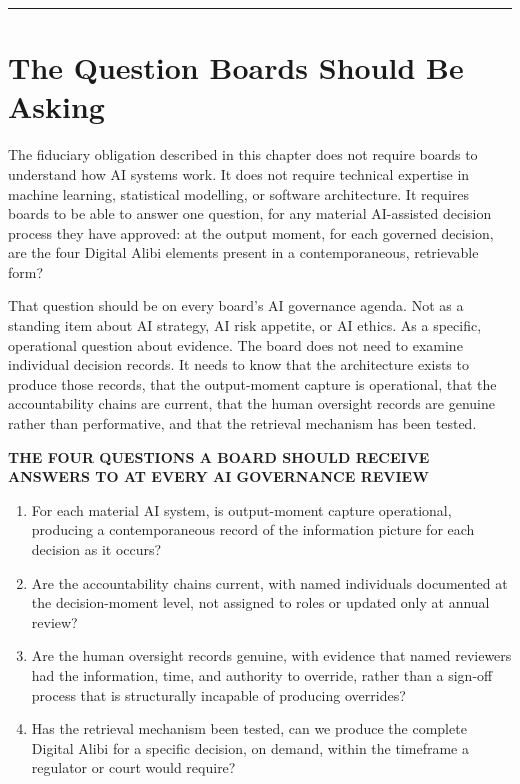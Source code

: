 \begin{center}\rule{0.5\linewidth}{0.5pt}\end{center}

\section{The Question Boards Should Be Asking}

The fiduciary obligation described in this chapter does not require boards to understand how AI systems work. It does not require technical expertise in machine learning, statistical modelling, or software architecture. It requires boards to be able to answer one question, for any material AI-assisted decision process they have approved: at the output moment, for each governed decision, are the four Digital Alibi elements present in a contemporaneous, retrievable form?

That question should be on every board's AI governance agenda. Not as a standing item about AI strategy, AI risk appetite, or AI ethics. As a specific, operational question about evidence. The board does not need to examine individual decision records. It needs to know that the architecture exists to produce those records, that the output-moment capture is operational, that the accountability chains are current, that the human oversight records are genuine rather than performative, and that the retrieval mechanism has been tested.

\textbf{THE FOUR QUESTIONS A BOARD SHOULD RECEIVE ANSWERS TO AT EVERY AI GOVERNANCE REVIEW}

\begin{enumerate}
\def\labelenumi{\arabic{enumi}.}
\tightlist
\item
  For each material AI system, is output-moment capture operational, producing a contemporaneous record of the information picture for each decision as it occurs?
\item
  Are the accountability chains current, with named individuals documented at the decision-moment level, not assigned to roles or updated only at annual review?
\item
  Are the human oversight records genuine, with evidence that named reviewers had the information, time, and authority to override, rather than a sign-off process that is structurally incapable of producing overrides?
\item
  Has the retrieval mechanism been tested, can we produce the complete Digital Alibi for a specific decision, on demand, within the timeframe a regulator or court would require?
\end{enumerate}

